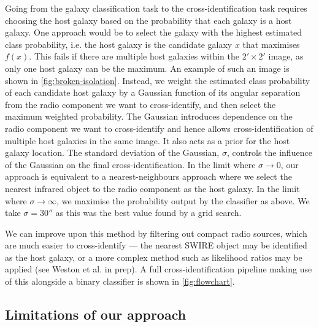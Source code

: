 \documentclass[fleqn,usenatbib,usedcolumn]{mnras}
\begin{document}
    Going from the galaxy classification task to the cross-identification task
    requires choosing the host galaxy based on the probability that each
    galaxy is a host galaxy. One approach would be to select the galaxy with
    the highest estimated class probability, i.e. the host galaxy is the candidate galaxy $x$ that maximises $f(x)$. This fails if there are multiple host galaxies within the $2' \times
    2'$ image, as only one host galaxy can be the maximum. An example of such
    an image is shown in \autoref{fig:broken-isolation}. Instead, we weight
    the estimated class probability of each candidate host galaxy by a Gaussian function of
    its angular separation from the radio component we want to cross-identify,
    and then select the maximum weighted probability.
    The Gaussian introduces dependence on the radio component we want to cross-identify and hence allows cross-identification of multiple host galaxies in the same image. It also acts as a prior for the host galaxy location. The standard deviation of the
    Gaussian, $\sigma$, controls the influence of the Gaussian on the final
    cross-identification. In the limit where $\sigma \to 0$, our approach is
    equivalent to a nearest-neighbours approach where we select the nearest
    infrared object to the radio component as the host galaxy. In the limit
    where $\sigma \to \infty$, we maximise the probability output by the
    classifier as above. We take $\sigma = 30''$ as this was the best value found by a grid search.

    We can improve upon this method by filtering out compact radio sources,
    which are much easier to cross-identify --- the nearest SWIRE object may
    be identified as the host galaxy, or a more complex method such as
    likelihood ratios may be applied (see Weston et al. in prep). A full
    cross-identification pipeline making use of this alongside a binary
    classifier is shown in \autoref{fig:flowchart}.

  \subsection{Limitations of our approach}
    \label{sec:limitations}
\end{document}
